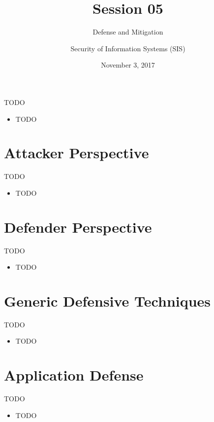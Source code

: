 \documentclass{curs}
\title[Session 05]{Session 05}
\subtitle{Defense and Mitigation}
\author{Security of Information Systems (SIS)}
\date{November 3, 2017}
\begin{document}
\frame{\titlepage}

\begin{frame}{TODO}
  \begin{itemize}
    \item TODO
  \end{itemize}
\end{frame}


\section{Attacker Perspective}

\begin{frame}{TODO}
  \begin{itemize}
    \item TODO
  \end{itemize}
\end{frame}


\section{Defender Perspective}

\begin{frame}{TODO}
  \begin{itemize}
    \item TODO
  \end{itemize}
\end{frame}


\section{Generic Defensive Techniques}

\begin{frame}{TODO}
  \begin{itemize}
    \item TODO
  \end{itemize}
\end{frame}


\section{Application Defense}

\begin{frame}{TODO}
  \begin{itemize}
    \item TODO
  \end{itemize}
\end{frame}
\end{document}
